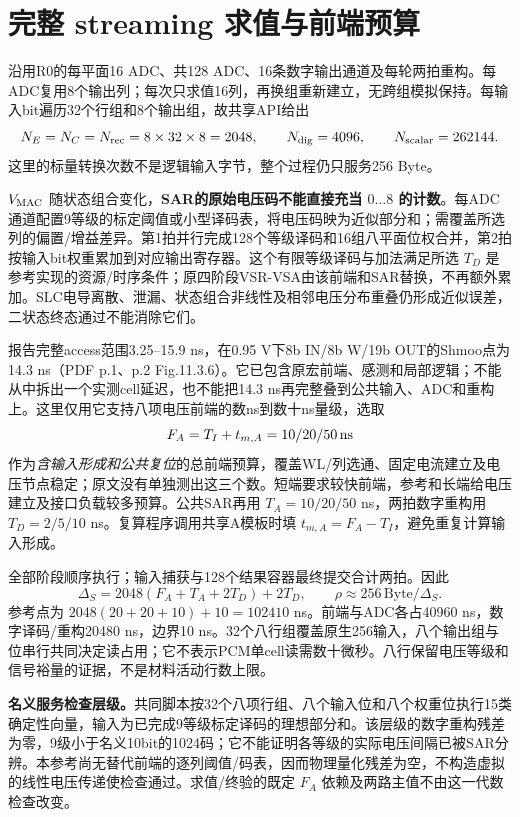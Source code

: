 \section{完整 streaming 求值与前端预算}

沿用R0的每平面16 ADC、共128 ADC、16条数字输出通道及每轮两拍重构。每ADC复用8个输出列；每次只求值16列，再换组重新建立，无跨组模拟保持。每输入bit遍历32个行组和8个输出组，故共享API给出
\[
 N_E=N_C=N_{\rm rec}=8\times32\times8=2048,\qquad
 N_{\rm dig}=4096,\qquad N_{\rm scalar}=262144.
\]
这里的标量转换次数不是逻辑输入字节，整个过程仍只服务256 Byte。

$V_{\rm MAC}$ 随状态组合变化，\textbf{SAR的原始电压码不能直接充当 $0\ldots8$ 的计数}。每ADC通道配置9等级的标定阈值或小型译码表，将电压码映为近似部分和；需覆盖所选列的偏置/增益差异。第1拍并行完成128个等级译码和16组八平面位权合并，第2拍按输入bit权重累加到对应输出寄存器。这个有限等级译码与加法满足所选 $T_D$ 是参考实现的资源/时序条件；原四阶段VSR-VSA由该前端和SAR替换，不再额外累加。SLC电导离散、泄漏、状态组合非线性及相邻电压分布重叠仍形成近似误差，二状态终态通过不能消除它们。

 报告完整access范围3.25--15.9 ns，在0.95 V下8b IN/8b W/19b OUT的Shmoo点为14.3 ns（PDF p.1、p.2 Fig.11.3.6）。它已包含原宏前端、感测和局部逻辑；不能从中拆出一个实测cell延迟，也不能把14.3 ns再完整叠到公共输入、ADC和重构上。这里仅用它支持八项电压前端的数ns到数十ns量级，选取
\[
 F_A=T_I+t_{m,A}=10/20/50\,\mathrm{ns}
\]
作为\emph{含输入形成和公共复位}的总前端预算，覆盖WL/列选通、固定电流建立及电压节点稳定；原文没有单独测出这三个数。短端要求较快前端，参考和长端给电压建立及接口负载较多预算。公共SAR再用 $T_A=10/20/50$ ns，两拍数字重构用 $T_D=2/5/10$ ns。复算程序调用共享A模板时填 $t_{m,A}=F_A-T_I$，避免重复计算输入形成。

全部阶段顺序执行；输入捕获与128个结果容器最终提交合计两拍。因此
\begin{equation}
 \boxed{\Delta_S=2048(F_A+T_A+2T_D)+2T_D,\qquad
 \rho\approx256\,\mathrm{Byte}/\Delta_S.}
\end{equation}
参考点为 $2048(20+20+10)+10=102410$ ns。前端与ADC各占40960 ns，数字译码/重构20480 ns，边界10 ns。32个八行组覆盖原生256输入，八个输出组与位串行共同决定读占用；它不表示PCM单cell读需数十微秒。八行保留电压等级和信号裕量的证据，不是材料活动行数上限。

\textbf{名义服务检查层级。}共同脚本按32个八项行组、八个输入位和八个权重位执行15类确定性向量，输入为已完成9等级标定译码的理想部分和。该层级的数字重构残差为零，9级小于名义10bit的1024码；它不能证明各等级的实际电压间隔已被SAR分辨。本参考尚无替代前端的逐列阈值/码表，因而物理量化残差为空，不构造虚拟的线性电压传递使检查通过。求值/终验的既定 $F_A$ 依赖及两路主值不由这一代数检查改变。

